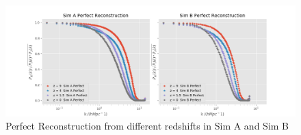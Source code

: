 \begin{figure}
    \centering
    \includegraphics[width=1\columnwidth]{images/crossSpectra/Spec_3_perf.png}%
    
    \caption{
    Perfect Reconstruction from different redshifts in Sim A and Sim B
    }
    
    \label{fig:6}
\end{figure}